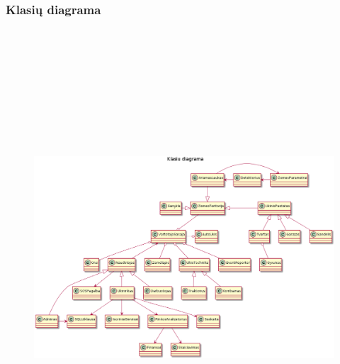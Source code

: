 \documentclass[oneside]{VUMIFPSkursinis}
\begin{document}
\subsubsection{Klasių diagrama}
			\begin{figure}[H]
		\centering	
\includegraphics[width=18cm,height=17cm,keepaspectratio]{Klasesv2.png}
	\caption{}
	\label{fig:Klasesv2}
\end{figure}
	
\end{document}
